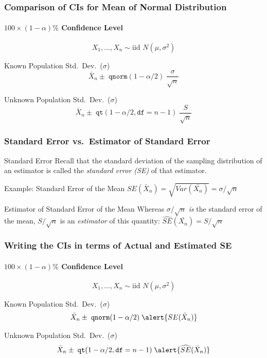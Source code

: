 \begin{frame}
\frametitle{Comparison of CIs for Mean of Normal Distribution}
\framesubtitle{$100\times(1-\alpha)\%$ Confidence Level}
$$\boxed{X_1, \hdots, X_n \sim \mbox{iid } N(\mu, \sigma^2)}$$


\begin{block}{Known Population Std.\ Dev.\ ($\sigma$)}
	$$\bar{X}_n \pm \; \texttt{qnorm}(1-\alpha/2) \; \frac{\sigma}{\sqrt{n}}$$
\end{block}


\begin{block}{Unknown Population Std.\ Dev.\ ($\sigma$)}
$$\bar{X}_n \pm \; \texttt{qt}(1-\alpha/2, \texttt{df} = n-1) \; \frac{S}{\sqrt{n}}$$
\end{block}
\end{frame}
\begin{frame}
\frametitle{Standard Error vs.\ Estimator of Standard Error}
\begin{block}{Standard Error}
Recall that the standard deviation of  the sampling distribution of an estimator is called the \emph{\alert{standard error} (SE)} of that estimator.
\end{block}
\begin{block}{Example: Standard Error of the Mean}
$SE(\bar{X}_n) = \sqrt{Var\left(\bar{X_n}\right)} = \sigma/\sqrt{n}$
\end{block}



\begin{alertblock}{Estimator of Standard Error of the Mean} Whereas $\sigma/\sqrt{n}$ \alert{\emph{is}} the standard error of the mean, $S/\sqrt{n}$ is an \alert{\emph{estimator}} of this quantity: $\widehat{SE}(\bar{X_n}) = S/\sqrt{n}$
\end{alertblock}
\end{frame}
\begin{frame}
\frametitle{Writing the CIs in terms of Actual and Estimated SE}
\framesubtitle{$100\times(1-\alpha)\%$ Confidence Level}
$$\boxed{X_1, \hdots, X_n \sim \mbox{iid } N(\mu, \sigma^2)}$$

\begin{block}{Known Population Std.\ Dev.\ ($\sigma$)}
	$$\bar{X}_n \pm \; \texttt{qnorm}(1-\alpha/2) \; \alert{SE(\bar{X}_n)}$$
\end{block}

\begin{block}{Unknown Population Std.\ Dev.\ ($\sigma$)}
$$\bar{X}_n \pm \; \texttt{qt}(1-\alpha/2, \texttt{df} = n-1) \; \alert{\widehat{SE}(\bar{X}_n)}$$
\end{block}
\end{frame}
